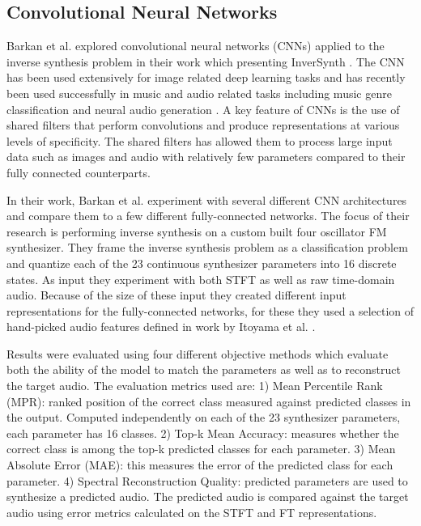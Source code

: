 \subsection{Convolutional Neural Networks}
Barkan et al. explored convolutional neural networks (CNNs) applied to the inverse synthesis problem in their work which presenting InverSynth \cite{barkan2019deep}. The CNN has been used extensively for image related deep learning tasks and has recently been used successfully in music and audio related tasks including music genre classification \cite{choi2016automatic} and neural audio generation \cite{donahue2018adversarial}. A key feature of CNNs is the use of shared filters that perform convolutions and produce representations at various levels of specificity. The shared filters has allowed them to process large input data such as images and audio with relatively few parameters compared to their fully connected counterparts. 

In their work, Barkan et al. experiment with several different CNN architectures and compare them to a few different fully-connected networks. The focus of their research is performing inverse synthesis on a custom built four oscillator FM synthesizer. They frame the inverse synthesis problem as a classification problem and quantize each of the 23 continuous synthesizer parameters into 16 discrete states. As input they experiment with both STFT as well as raw time-domain audio. Because of the size of these input they created different input representations for the fully-connected networks, for these they used a selection of hand-picked audio features defined in work by Itoyama et al. \cite{itoyama2014parameter}.

Results were evaluated using four different objective methods which evaluate both the ability of the model to match the parameters as well as to reconstruct the target audio. The evaluation metrics used are:
1) Mean Percentile Rank (MPR): ranked position of the correct class measured against predicted classes in the output. Computed independently on each of the 23 synthesizer parameters, each parameter has 16 classes.
2) Top-k Mean Accuracy: measures whether the correct class is among the top-k predicted classes for each parameter.
3) Mean Absolute Error (MAE): this measures the error of the predicted class for each parameter.
4) Spectral Reconstruction Quality: predicted parameters are used to synthesize a predicted audio. The predicted audio is compared against the target audio using error metrics calculated on the STFT and FT representations.

